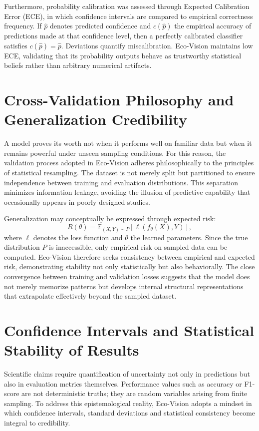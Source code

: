 \documentclass[12pt,a4paper]{report}
\begin{document}
Furthermore, probability calibration was assessed through Expected Calibration Error (ECE), in which confidence intervals are compared to empirical correctness frequency. If \(\hat{p}\) denotes predicted confidence and \(c(\hat{p})\) the empirical accuracy of predictions made at that confidence level, then a perfectly calibrated classifier satisfies \(c(\hat{p}) = \hat{p}\). Deviations quantify miscalibration. Eco-Vision maintains low ECE, validating that its probability outputs behave as trustworthy statistical beliefs rather than arbitrary numerical artifacts.

\section{Cross-Validation Philosophy and Generalization Credibility}

A model proves its worth not when it performs well on familiar data but when it remains powerful under unseen sampling conditions. For this reason, the validation process adopted in Eco-Vision adheres philosophically to the principles of statistical resampling. The dataset is not merely split but partitioned to ensure independence between training and evaluation distributions. This separation minimizes information leakage, avoiding the illusion of predictive capability that occasionally appears in poorly designed studies.

Generalization may conceptually be expressed through expected risk:
\[
R(\theta) = \mathbb{E}_{(X,Y) \sim P}[\ell(f_{\theta}(X), Y)],
\]
where \(\ell\) denotes the loss function and \(\theta\) the learned parameters. Since the true distribution \(P\) is inaccessible, only empirical risk on sampled data can be computed. Eco-Vision therefore seeks consistency between empirical and expected risk, demonstrating stability not only statistically but also behaviorally. The close convergence between training and validation losses suggests that the model does not merely memorize patterns but develops internal structural representations that extrapolate effectively beyond the sampled dataset.

\section{Confidence Intervals and Statistical Stability of Results}

Scientific claims require quantification of uncertainty not only in predictions but also in evaluation metrics themselves. Performance values such as accuracy or F1-score are not deterministic truths; they are random variables arising from finite sampling. To address this epistemological reality, Eco-Vision adopts a mindset in which confidence intervals, standard deviations and statistical consistency become integral to credibility.
\end{document}

